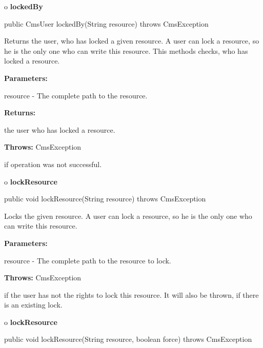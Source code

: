 o {\bf lockedBy}

\begin{PRE}
 public CmsUser lockedBy(String resource) throws CmsException
\end{PRE}

\begin{description}
\htmlDD Returns the user, who has locked a given resource. \htmlBR
A user can lock a resource, so he is the only one who can write this resource.
This methods checks, who has locked a resource.

\begin{description}
\item {\bf Parameters:}

resource - The complete path to the resource.
\item {\bf Returns:}

the user who has locked a resource.
\item {\bf Throws:} CmsException

if operation was not successful.
\end{description}

\end{description}

o {\bf lockResource}

\begin{PRE}
 public void lockResource(String resource) throws CmsException
\end{PRE}

\begin{description}
\htmlDD Locks the given resource. \htmlBR
A user can lock a resource, so he is the only one who can write this resource.


\begin{description}
\item {\bf Parameters:}

resource - The complete path to the resource to lock.
\item {\bf Throws:} CmsException

if the user has not the rights to lock this resource. It will also be thrown,
if there is an existing lock.
\end{description}

\end{description}

o {\bf lockResource}

\begin{PRE}
 public void lockResource(String resource,
                          boolean force) throws CmsException
\end{PRE}

